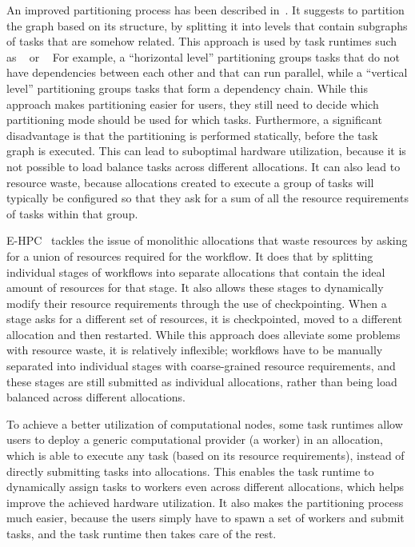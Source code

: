 An improved partitioning process has been described in~\cite{zhang_batch_scheduling}. It suggests
to partition the graph based on its structure, by splitting it into levels that contain
subgraphs of tasks that are somehow related. This approach is used by
task runtimes such as \pegasus{}~\cite{pegasus} or
\autosubmit~\cite{autosubmit} For example, a ``horizontal level'' partitioning groups tasks that
do not have dependencies between each other and that can run parallel, while a ``vertical level''
partitioning groups tasks that form a dependency chain. While this approach makes partitioning easier for users,
they still need to decide which partitioning mode should be used for which tasks. Furthermore, a
significant disadvantage is that the partitioning is performed statically, before the task graph is
executed. This can lead to suboptimal hardware utilization, because it is not possible to load
balance tasks across different allocations. It can also lead to resource waste, because allocations
created to execute a group of tasks will typically be configured so that they ask for a sum of all
the resource requirements of tasks within that group.

\textsc{E-HPC}~\cite{ehpc} tackles the issue of monolithic allocations that
waste resources by asking for a union of resources required for the workflow. It does that by
splitting individual stages of workflows into separate allocations that contain the ideal amount of
resources for that stage. It also allows these stages to dynamically modify their resource
requirements through the use of checkpointing. When a stage asks for a different set of resources,
it is checkpointed, moved to a different allocation and then restarted. While this approach does
alleviate some problems with resource waste, it is relatively inflexible; workflows have to be
manually separated into individual stages with coarse-grained resource requirements, and these
stages are still submitted as individual allocations, rather than being load balanced across
different allocations.

To achieve a better utilization of computational nodes, some task runtimes allow users to deploy a
generic computational provider (a worker) in an allocation, which is able to execute any task
(based on its resource requirements), instead of directly submitting tasks into allocations. This
enables the task runtime to dynamically assign tasks to workers even across different allocations,
which helps improve the achieved hardware utilization. It also makes the partitioning process much
easier, because the users simply have to spawn a set of workers and submit tasks, and the task
runtime then takes care of the rest.

